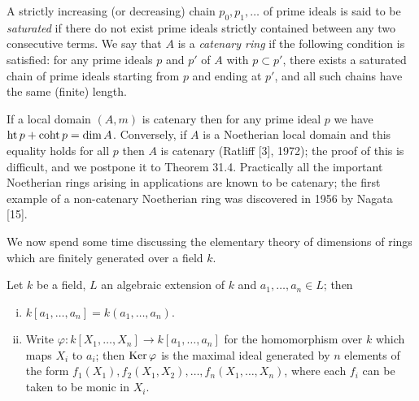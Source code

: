 A strictly increasing (or decreasing) chain $p_0, p_1, \ldots$ of prime ideals is said
to be \emph{saturated} if there do not exist prime ideals strictly contained between
any two consecutive terms. We say that $A$ is a \emph{catenary ring} if the following
condition is satisfied: for any prime ideals $p$ and $p'$ of $A$ with $p \subset p'$, there
exists a saturated chain of prime ideals starting from $p$ and ending at $p'$, and
all such chains have the same (finite) length.

If a local domain $(A, m)$ is catenary then for any prime ideal $p$ we have
$\operatorname{ht} p + \operatorname{coht} p = \dim A$. Conversely, if $A$ is a Noetherian local domain and
this equality holds for all $p$ then $A$ is catenary (Ratliff [3], 1972); the proof
of this is difficult, and we postpone it to Theorem 31.4. Practically all the
important Noetherian rings arising in applications are known to be
catenary; the first example of a non-catenary Noetherian ring was
discovered in 1956 by Nagata [15].

We now spend some time discussing the elementary theory of dimensions
of rings which are finitely generated over a field $k$.

\begin{theorem}\label{thm:5.1}
Let $k$ be a field, $L$ an algebraic extension of $k$ and
$a_1, \ldots, a_n \in L$; then
\begin{enumerate}[(i)]
  \item $k[a_1, \ldots, a_n] = k(a_1, \ldots, a_n)$.
  \item Write $\varphi\colon k[X_1, \ldots, X_n] \to k[a_1, \ldots, a_n]$ for the homomorphism
        over $k$ which maps $X_i$ to $a_i$; then $\operatorname{Ker} \varphi$ is the maximal ideal generated
        by $n$ elements of the form $f_1(X_1), f_2(X_1, X_2), \ldots, f_n(X_1, \ldots, X_n)$, where
        each $f_i$ can be taken to be monic in $X_i$.
\end{enumerate}
\end{theorem}

